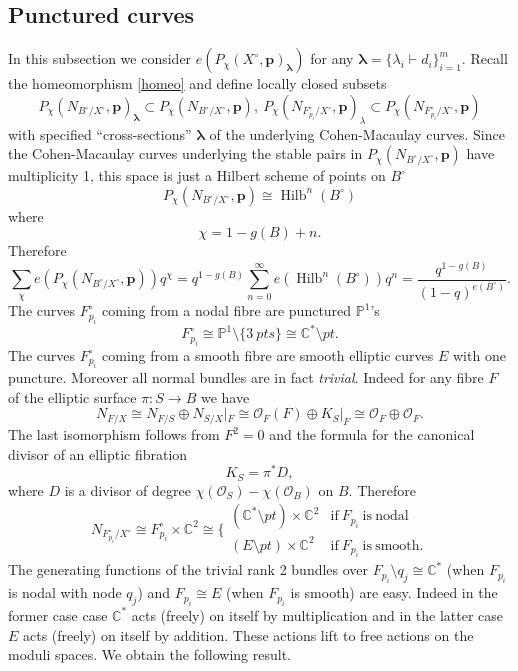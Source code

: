 \documentclass[12pt]{amsart}
\theoremstyle{definition}
\theoremstyle{property}
\renewcommand\O{\mathcal O}
\newcommand\PP{\mathbb P}
\newcommand\p{\mathbf{p}}
\newcommand\bslambda{\boldsymbol{\lambda}}
\newcommand\C{\mathbb C}
\renewcommand\_{^{}_}
\newcommand\Hilb{\operatorname{Hilb}}
\begin{document}
\subsection{Punctured curves}

In this subsection we consider $e(P_{\chi}(X^{\circ},\p)_{\bslambda})$ for any $\bslambda = \{\lambda_i \vdash d_i\}_{i=1}^{m}$. Recall the homeomorphism \eqref{homeo} and define locally closed subsets
$$
P_{\chi}(N_{B^{\circ} / X^\circ}, \p)_{\bslambda} \subset P_{\chi}(N_{B^{\circ} / X^\circ}, \p), \ P_{\chi}(N_{F_{p_i}^{\circ} / X^\circ}, \p)_{\lambda} \subset P_{\chi}(N_{F_{p_i}^{\circ} / X^\circ}, \p)
$$
with specified ``cross-sections'' $\bslambda$ of the underlying Cohen-Macaulay curves. Since the Cohen-Macaulay curves underlying the stable pairs in $P_{\chi}(N_{B^{\circ} / X^\circ}, \p)$ have multiplicity 1, this space is just a Hilbert scheme of points on $B^\circ$ \cite{PT3}
\[
P_{\chi}(N_{B^{\circ} / X^\circ}, \p) \cong \Hilb^n(B^{\circ})
\]
where
$$
\chi = 1 - g(B) + n.
$$
Therefore
\begin{equation} \label{secgenfun}
\sum_{\chi} e(P_{\chi}(N_{B^{\circ} / X^\circ}, \p)) q^{\chi} = q^{1-g(B)} \sum_{n = 0}^{\infty} e(\Hilb^n(B^{\circ})) q^n = \frac{q^{1-g(B)}}{(1-q)^{e(B^{\circ})}}.
\end{equation}
The curves $F_{p_i}^{\circ}$ coming from a nodal fibre are punctured $\PP^1$'s
$$
F_{p_i}^{\circ} \cong \PP^1 \setminus \{3 \ pts\} \cong \C^{*} \setminus pt.
$$
The curves $F_{p_i}^{\circ}$ coming from a smooth fibre are smooth elliptic curves $E$ with one puncture. Moreover all normal bundles are in fact \emph{trivial}. Indeed for any fibre $F$ of the elliptic surface $\pi : S \rightarrow B$ we have
$$
N_{F / X} \cong N_{F/S} \oplus N_{S/X}|_{F} \cong \O_{F}(F) \oplus K_{S}|_{F} \cong \O_{F} \oplus \O_{F}.
$$ 
The last isomorphism follows from $F^2 = 0$ and the formula for the canonical divisor of an elliptic fibration \cite{Mir}
$$
K_S = \pi^* D,
$$
where $D$ is a divisor of degree $\chi(\O_S) - \chi(\O_B)$ on $B$. Therefore
$$
N_{F_{p_i}^{\circ} / X^\circ} \cong F_{p_i}^{\circ} \times \C^2 \cong \Big\{ \begin{array}{cc} (\C^{*} \setminus pt) \times \C^2 & \mathrm{if } \ F_{p_i} \ \mathrm{is \ nodal} \\ (E \setminus pt) \times \C^2 & \mathrm{if } \ F_{p_i} \ \mathrm{is \ smooth.} \end{array}
$$
The generating functions of the trivial rank 2 bundles over $F_{p_i} \setminus q_j \cong \C^*$ (when $F_{p_i}$ is nodal with node $q_j$) and $F_{p_i} \cong E$ (when $F_{p_i}$ is smooth) are easy. Indeed in the former case case $\C^*$ acts (freely) on itself by multiplication and in the latter case $E$ acts (freely) on itself by addition. These actions lift to free actions on the moduli spaces. We obtain the following result.
\end{document}
